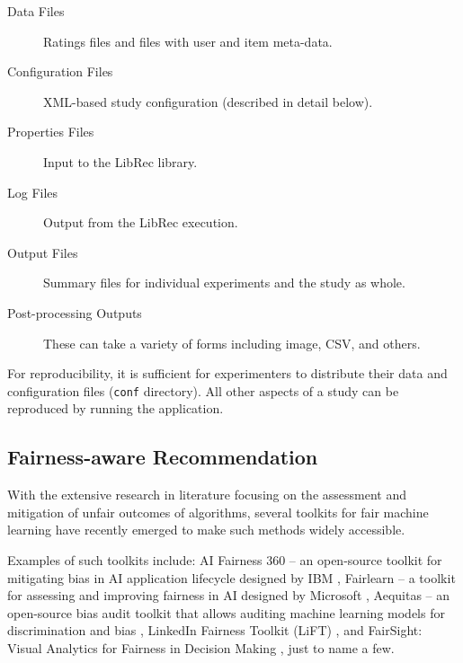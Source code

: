 \begin{description}
    \item[Data Files] Ratings files and files with user and item meta-data.
    \item[Configuration Files] XML-based study configuration (described in detail below).
    \item[Properties Files] Input to the LibRec library.
    \item[Log Files] Output from the LibRec execution.
    \item[Output Files] Summary files for individual experiments and the study as whole.
    \item[Post-processing Outputs] These can take a variety of forms including image, CSV, and others.
\end{description}

For reproducibility, it is sufficient for experimenters to distribute their data and configuration files (\texttt{conf} directory). All other aspects of a study can be reproduced by running the \libauto{} application.

\subsection{Fairness-aware Recommendation}
\label{subsec:libauto_fair_tools}

With the extensive research in literature focusing on the assessment and mitigation of unfair outcomes of algorithms, several toolkits for fair machine learning have recently emerged to make such methods widely accessible.

Examples of such toolkits include: AI Fairness 360 -- an open-source toolkit for mitigating bias in AI application lifecycle designed by IBM \cite{bellamy2019ai}, Fairlearn -- a toolkit for assessing and improving fairness in AI designed by Microsoft \cite{bird2020fairlearn}, Aequitas -- an open-source bias audit toolkit that allows auditing machine learning models for discrimination and bias \cite{saleiro2018aequitas}, LinkedIn Fairness Toolkit (LiFT) \cite{SriramLifT2020}, and FairSight: Visual Analytics for Fairness in Decision Making \cite{ahn2019fairsight}, just to name a few.

